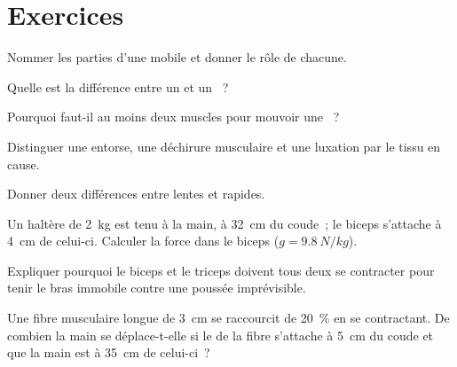 \section{Exercices}

\begin{exercise}[$\star$]\label{exo:g10:muscles-and-joints:1}
Nommer les parties d'une  mobile et donner le rôle de chacune.
\end{exercise}

\begin{exercise}[$\star$]\label{exo:g10:muscles-and-joints:2}
Quelle est la différence entre un  et un ~?
\end{exercise}

\begin{exercise}[$\star$]\label{exo:g10:muscles-and-joints:3}
Pourquoi faut-il au moins deux muscles pour mouvoir une ~?
\end{exercise}

\begin{exercise}[$\star$]\label{exo:g10:muscles-and-joints:4}
Distinguer une entorse, une déchirure musculaire et une luxation par le
tissu en cause.
\end{exercise}

\begin{exercise}[$\star$]\label{exo:g10:muscles-and-joints:5}
Donner deux différences entre  lentes et rapides.
\end{exercise}

\begin{exercise}[$\star\star$]\label{exo:g10:muscles-and-joints:6}
Un haltère de \qty{2}{kg} est tenu à la main, à \qty{32}{cm} du coude~;
le biceps s'attache à \qty{4}{cm} de celui-ci. Calculer la force dans
le biceps ($g = \qty{9.8}{N/kg}$).
\end{exercise}

\begin{exercise}[$\star\star$]\label{exo:g10:muscles-and-joints:7}
Expliquer pourquoi le biceps et le triceps doivent tous deux se
contracter pour tenir le bras immobile contre une poussée imprévisible.
\end{exercise}

\begin{exercise}[$\star\star$]\label{exo:g10:muscles-and-joints:8}
Une fibre musculaire longue de \qty{3}{cm} se raccourcit de 20~\% en se
contractant. De combien la main se déplace-t-elle si le  de la
fibre s'attache à \qty{5}{cm} du coude et que la main est à
\qty{35}{cm} de celui-ci~?
\end{exercise}

